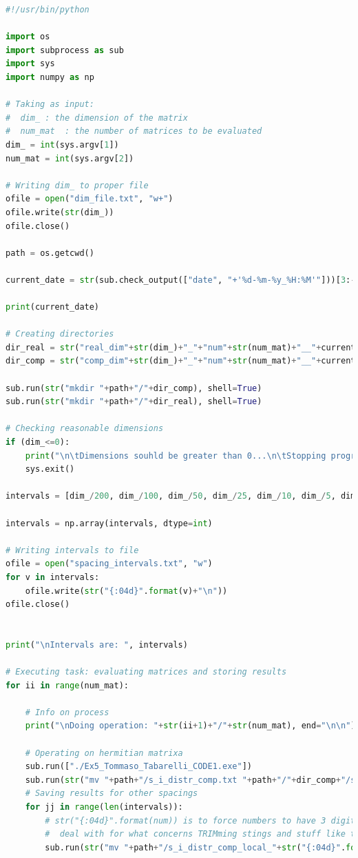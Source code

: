 \documentclass[12pt, a4paper, notitlepage]{report}
\begin{document}
\begin{lstlisting}[language=Python]
#!/usr/bin/python

import os
import subprocess as sub
import sys
import numpy as np

# Taking as input:
#  dim_	: the dimension of the matrix
#  num_mat	: the number of matrices to be evaluated
dim_ = int(sys.argv[1])
num_mat = int(sys.argv[2])

# Writing dim_ to proper file
ofile = open("dim_file.txt", "w+")
ofile.write(str(dim_))
ofile.close()

path = os.getcwd()

current_date = str(sub.check_output(["date", "+'%d-%m-%y_%H:%M'"]))[3:-4].replace("/", "-")

print(current_date)

# Creating directories
dir_real = str("real_dim"+str(dim_)+"_"+"num"+str(num_mat)+"__"+current_date)
dir_comp = str("comp_dim"+str(dim_)+"_"+"num"+str(num_mat)+"__"+current_date)

sub.run(str("mkdir "+path+"/"+dir_comp), shell=True)
sub.run(str("mkdir "+path+"/"+dir_real), shell=True)

# Checking reasonable dimensions
if (dim_<=0):
	print("\n\tDimensions souhld be greater than 0...\n\tStopping program.\n")
	sys.exit()

intervals = [dim_/200, dim_/100, dim_/50, dim_/25, dim_/10, dim_/5, dim_/2]

intervals = np.array(intervals, dtype=int)

# Writing intervals to file
ofile = open("spacing_intervals.txt", "w")
for v in intervals:
	ofile.write(str("{:04d}".format(v)+"\n"))
ofile.close()


print("\nIntervals are: ", intervals)

# Executing task: evaluating matrices and storing results
for ii in range(num_mat):
	
	# Info on process
	print("\nDoing operation: "+str(ii+1)+"/"+str(num_mat), end="\n\n")
	
	# Operating on hermitian matrixa
	sub.run(["./Ex5_Tommaso_Tabarelli_CODE1.exe"])
	sub.run(str("mv "+path+"/s_i_distr_comp.txt "+path+"/"+dir_comp+"/s_i_distr"+str(ii)+".txt"), shell=True)
	# Saving results for other spacings
	for jj in range(len(intervals)):
		# str("{:04d}".format(num)) is to force numbers to have 3 digits (Fortran is hard to
		#  deal with for what concerns TRIMming stings and stuff like that...
		sub.run(str("mv "+path+"/s_i_distr_comp_local_"+str("{:04d}".format(intervals[jj]))+".txt "+path+"/"+dir_comp+"/s_i_distr_interv"+str("{:04d}".format(intervals[jj]))+"_"+str(ii)+".txt"), shell=True)
	

\end{lstlisting}
\end{document}
